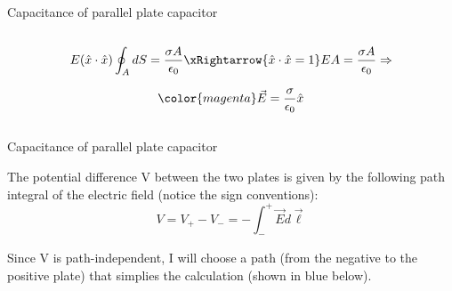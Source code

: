\begin{frame}{Capacitance of parallel plate capacitor}
\begin{columns}
\begin{column}{0.70\textwidth}
     \begin{equation*}
       E (\hat{x} \cdot \hat{x}) \oint_{A} dS = \frac{\sigma A}{\epsilon_0} \xRightarrow{\hat{x}\cdot\hat{x}=1}
       E A = \frac{\sigma A}{\epsilon_0} \Rightarrow
     \end{equation*}

     \begin{equation*}
        {\color{magenta} \vec{E} = \frac{\sigma}{\epsilon_0} \hat{x} }
     \end{equation*}
  \end{column}
\end{columns}

\end{frame}

%
%
%

\begin{frame}{Capacitance of parallel plate capacitor}

The potential difference V between the two plates is given by the following path
integral of the electric field (notice the sign conventions):
\begin{equation*}
   V = V_{+} - V_{-} = - \int_{-}^{+} \vec{E} d\vec{\ell}
\end{equation*}

Since V is path-independent, I will choose a path (from the negative to the positive plate)
that simplies the calculation (shown in blue below).


\end{frame}
